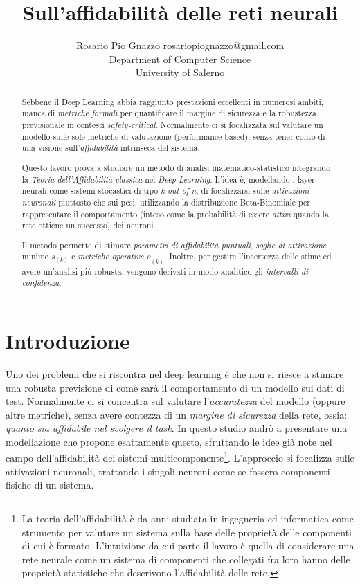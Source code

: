 \documentclass[10pt]{article} %
\title{Sull'affidabilità delle reti neurali}
\author{\name Rosario Pio Gnazzo \email rosariopiognazzo@gmail.com \\
      \addr Department of Computer Science\\
      University of Salerno}
\begin{document}
\maketitle

\begin{abstract}
Sebbene il Deep Learning abbia raggiunto prestazioni eccellenti in numerosi ambiti, manca di \textit{metriche formali} per quantificare il margine di sicurezza e la robustezza previsionale in contesti \textit{safety-critical}. Normalmente ci si focalizzata sul valutare un modello sulle sole metriche di valutazione (performance-based), senza tener conto di una visione sull'\textit{affidabilità} intrinseca del sistema.

Questo lavoro prova a studiare un metodo di analisi matematico-statistico integrando la \textit{Teoria dell'Affidabilità classica} nel \textit{Deep Learning}. L'idea è, modellando i layer neurali come sistemi stocastici di tipo \textit{k-out-of-n}, di focalizzarsi sulle \textit{attivazioni neuronali} piuttosto che sui pesi, utilizzando la distribuzione Beta-Binomiale per rappresentare il comportamento (inteso come la probabilità di essere \textit{attivi} quando la rete ottiene un successo) dei neuroni.

Il metodo permette di stimare \textit{parametri di affidabilità puntuali}, \textit{soglie di attivazione} minime $s_{(k)}$ e \textit{metriche operative} $\rho_{(k)}$. Inoltre, per gestire l'incertezza delle stime ed avere un'analisi più robusta, vengono derivati in modo analitico gli \textit{intervalli di confidenza}.
\end{abstract}

\section{Introduzione}
\label{intro}
Uno dei problemi che si riscontra nel deep learning è che non si riesce a stimare una robusta previsione di come sarà il comportamento di un modello sui dati di test. Normalmente ci si concentra sul valutare l'\textit{accuratezza} del modello (oppure altre metriche), senza avere contezza di un \textit{margine di sicurezza} della rete, ossia: \textit{quanto sia affidabile nel svolgere il task}. In questo studio andrò a presentare una modellazione che propone esattamente questo, sfruttando le idee già note nel campo dell'affidabilità dei sistemi multicomponente\footnote{La teoria dell'affidabilità è da anni studiata in ingegneria ed informatica come strumento per valutare un sistema sulla base delle proprietà delle componenti di cui è formato. L'intuizione da cui parte il lavoro è quella di considerare una rete neurale come un sistema di componenti che collegati fra loro hanno delle proprietà statistiche che descrivono l'affidabilità delle rete.}. 
L'approccio si focalizza sulle attivazioni neuronali, trattando i singoli neuroni come se fossero componenti fisiche di un sistema.
\end{document}
